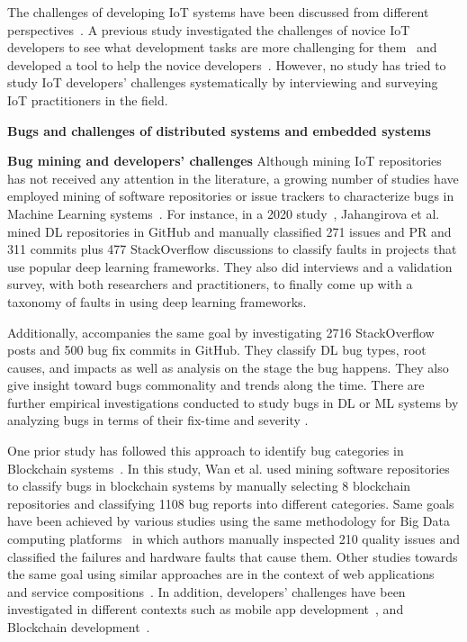 The challenges of developing IoT systems have been discussed from different perspectives~\cite{stojkoska2017review,vcolakovic2018IoT,hnat2011hitchhiker}. A previous study investigated the challenges of novice IoT developers to see what development tasks are more challenging for them~\cite{corno2019challenges} and developed a tool to help the novice developers~\cite{corno2019towards}. However, no study has tried to study IoT developers' challenges systematically by interviewing and surveying IoT practitioners in the field.


\textbf{Bugs and challenges of distributed systems and embedded systems}



\textbf{Bug mining and developers' challenges}
Although mining IoT repositories has not received any attention in the literature, a growing number of studies have employed mining of software repositories or issue trackers to characterize bugs in Machine Learning systems~\cite{DlTaxFaults,zhangempiricalDL2020ICSE,islam2019comprehensive, TensorFBugsISSTA}. For instance, in a 2020 study~\cite{DlTaxFaults}, Jahangirova et al. mined DL repositories in GitHub and manually classified 271 issues and PR and 311 commits plus 477 StackOverflow discussions to classify faults in projects that use popular deep learning frameworks. They also did interviews and a validation survey, with both researchers and practitioners, to finally come up with a taxonomy of faults in using deep learning frameworks.

Additionally, \cite{islam2019comprehensive} accompanies the same goal by investigating 2716 StackOverflow posts and 500 bug fix commits in GitHub. They classify DL bug types, root causes, and impacts as well as analysis on the stage the bug happens. They also give insight toward bugs commonality and trends along the time. There are further empirical investigations conducted to study bugs in DL or ML systems by analyzing bugs in terms of their fix-time and severity\cite{MLrealBugs} \cite{FerdianMLBugs} \cite{TensorFBugsISSTA}. 


 One prior study has followed this approach to identify bug categories in Blockchain systems~\cite{blockChainBugs}. In this study, Wan et al. used mining software repositories to classify bugs in blockchain systems \cite{blockChainBugs} by manually selecting 8 blockchain repositories and classifying 1108 bug reports into different categories. Same goals have been achieved by various studies using the same methodology for Big Data computing platforms~\cite{bigDataIssues} in which authors manually inspected 210 quality issues and classified the failures and hardware faults that cause them. Other studies towards the same goal using similar approaches are in the context of web applications~\cite{jsBugsOcariza} and service compositions~\cite{chan2007fault}. 
In addition, developers' challenges have been investigated in different contexts such as mobile app development~\cite{joorabchi2013real}, and Blockchain development~\cite{zou2019smart}. 


\endinput

